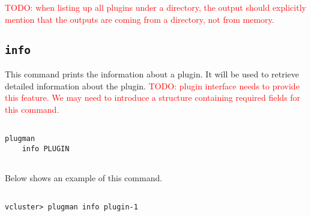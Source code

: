 \documentclass[11pt]{article}
\def \ttt{\texttt}
\begin{document}
\textcolor{red}{TODO: when listing up all plugins under a directory, the output should explicitly mention that the outputs are coming from a directory, not from memory.}


\subsection{\ttt{info}}
This command prints the information about a plugin. It will be used to retrieve detailed information about the plugin. \textcolor{red}{TODO: plugin interface needs to provide this feature. We may need to introduce a structure containing required fields for this command.}

\begin{Verbatim}[fontfamily=courier, fontsize = \small, obeytabs
=true, tabsize=4, frame=lines]

plugman 
    info PLUGIN
      
\end{Verbatim}

Below shows an example of this command.

\begin{Verbatim}[fontfamily=courier, fontsize = \small, obeytabs
=true, tabsize=4, frame=lines]

vcluster> plugman info plugin-1
      
\end{Verbatim}
\end{document}
